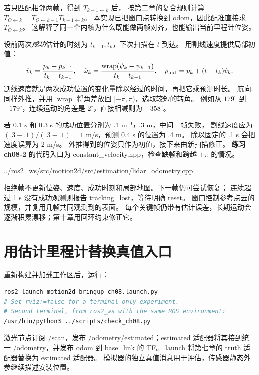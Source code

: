 若只匹配相邻两帧，得到 $T_{k-1\leftarrow k}$ 后，
按第二章的复合规则计算 $T_{O\leftarrow k}=T_{O\leftarrow k-1}T_{k-1\leftarrow k}$。
本实现已把窗口点转换到 odom，因此配准直接求 $T_{O\leftarrow k}$。
这解释了同一个内核为什么既能做两帧对齐，也能输出当前里程计位姿。

设前两次\emph{成功}估计的时刻为 $t_{k-1},t_k$，下次扫描在 $t$ 到达。
用割线速度提供局部初值：
\begin{equation}
\hat v_k=\frac{p_k-p_{k-1}}{t_k-t_{k-1}},\quad
\hat\omega_k=\frac{\operatorname{wrap}(\psi_k-\psi_{k-1})}{t_k-t_{k-1}},\quad
p_{\rm init}=p_k+(t-t_k)\hat v_k.
\end{equation}
割线速度就是两次成功位置的变化量除以经过的时间，再把它乘预测时长。
航向同样外推，并用 $\operatorname{wrap}$ 将角差放回 $[-\pi,\pi)$，选取较短的转角。
例如从 $179^\circ$ 到 $-179^\circ$，连续运动的角差是 $2^\circ$，直接相减则为 $-358^\circ$。

若 0.1 s 和 0.3 s 的成功位置分别为 .1 m 与 .3 m，中间一帧失败，
割线速度应为 $(.3-.1)/(.3-.1)=1$ m/s，预测 0.4 s 的位置为 .4 m。
除以固定的 .1 s 会把速度误算为 2 m/s。
外推得到的位姿只作为初值，接下来由新扫描修正。
\textbf{练习 ch08-2} 的代码入口为 constant\_velocity.hpp，检查缺帧和跨越 $\pm\pi$ 的情况。

\par\noindent\begin{minipage}{\linewidth}

{../ros2_ws/src/motion2d/src/estimation/lidar_odometry.cpp}
\end{minipage}\par

拒绝帧不更新位姿、速度、成功时刻和局部地图。下一帧仍可尝试恢复；
连续超过 1 s 没有成功观测则报告 tracking\_lost，等待明确 reset。
窗口控制参考点云的规模，并复用几帧共同观测到的表面。
每个关键帧仍带有估计误差，长期运动会逐渐积累漂移；第十章用回环约束修正它。

\section{用估计里程计替换真值入口}
重新构建并加载工作区后，运行：
\begin{lstlisting}[language=bash]
ros2 launch motion2d_bringup ch08.launch.py
# Set rviz:=false for a terminal-only experiment.
# Second terminal, from ros2_ws with the same ROS environment:
/usr/bin/python3 ../scripts/check_ch08.py
\end{lstlisting}
激光节点订阅 /scan，发布 /odometry/estimated；estimated 适配器将其接到统一
/odometry，并发布 odom 到 base\_link 的 TF。
launch 将第七章的 truth 适配器替换为 estimated 适配器。
模拟器的独立真值消息用于评估，传感器静态外参继续描述安装位置。

